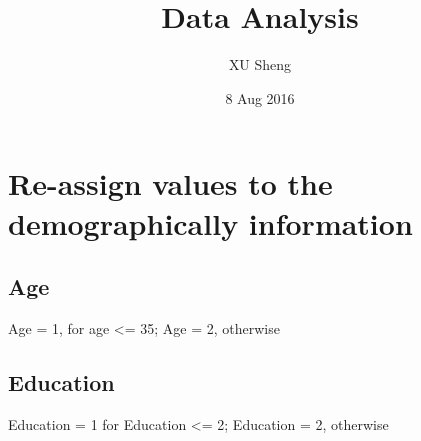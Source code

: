 \documentclass[11pt]{article}
\author{XU Sheng}
\date{8 Aug 2016}
\title{Data Analysis}
\begin{document}
\maketitle
\tableofcontents


\section{Re-assign values to the demographically information}
\label{sec-1}
\subsection{Age}
\label{sec-1-1}
Age = 1, for age <= 35; Age = 2, otherwise
\subsection{Education}
\label{sec-1-2}
Education = 1 for Education <= 2; Education = 2, otherwise
\end{document}
